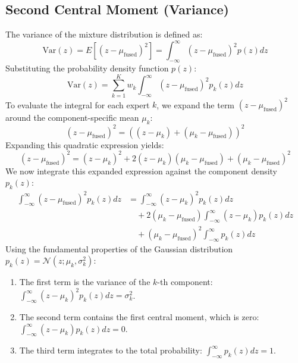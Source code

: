 \documentclass{article}
\theoremstyle{plain}
\theoremstyle{definition}
\theoremstyle{remark}
\begin{document}
\subsection{Second Central Moment (Variance)}
The variance of the mixture distribution is defined as:
\begin{equation}
    \text{Var}(z) = E[(z - \mu_{\text{fused}})^2] = \int_{-\infty}^{\infty} (z - \mu_{\text{fused}})^2 p(z) dz
\end{equation}
Substituting the probability density function $p(z)$:
\begin{equation}
    \text{Var}(z) = \sum_{k=1}^K w_k \int_{-\infty}^{\infty} (z - \mu_{\text{fused}})^2 p_k(z) dz
\end{equation}
To evaluate the integral for each expert $k$, we expand the term $(z - \mu_{\text{fused}})^2$ around the component-specific mean $\mu_k$:
\begin{equation}
    (z - \mu_{\text{fused}})^2 = \left( (z - \mu_k) + (\mu_k - \mu_{\text{fused}}) \right)^2
\end{equation}
Expanding this quadratic expression yields:
\begin{equation}
    (z - \mu_{\text{fused}})^2 = (z - \mu_k)^2 + 2(z - \mu_k)(\mu_k - \mu_{\text{fused}}) + (\mu_k - \mu_{\text{fused}})^2
\end{equation}
We now integrate this expanded expression against the component density $p_k(z)$:
\begin{align}
    \int_{-\infty}^{\infty} (z - \mu_{\text{fused}})^2 p_k(z) dz &= \int_{-\infty}^{\infty} (z - \mu_k)^2 p_k(z) dz \nonumber \\
    &\quad + 2(\mu_k - \mu_{\text{fused}}) \int_{-\infty}^{\infty} (z - \mu_k) p_k(z) dz \nonumber \\
    &\quad + (\mu_k - \mu_{\text{fused}})^2 \int_{-\infty}^{\infty} p_k(z) dz
\end{align}
Using the fundamental properties of the Gaussian distribution $p_k(z) = \mathcal{N}(z; \mu_k, \sigma^2_k)$:
\begin{enumerate}
    \item The first term is the variance of the $k$-th component: $\int_{-\infty}^{\infty} (z - \mu_k)^2 p_k(z) dz = \sigma^2_k$.
    \item The second term contains the first central moment, which is zero: $\int_{-\infty}^{\infty} (z - \mu_k) p_k(z) dz = 0$.
    \item The third term integrates to the total probability: $\int_{-\infty}^{\infty} p_k(z) dz = 1$.
\end{enumerate}
\end{document}
